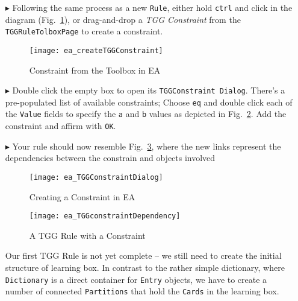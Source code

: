 \begin{enumerate}
\item[$\blacktriangleright$] Following the same process as a new \texttt{Rule}, either hold \texttt{ctrl} and click in the diagram
(Fig.~\ref{fig:common_toolbox}), or drag-and-drop a \emph{TGG Constraint} from the \texttt{TGGRuleTolboxPage} to create a constraint.

\begin{figure}[htbp]
\begin{center}
  \texttt{[image: ea\_createTGGConstraint]}
  \caption{Constraint from the Toolbox in EA}
  \label{fig:common_toolbox}
\end{center}
\end{figure}

\item[$\blacktriangleright$] Double click the empty box to open its \texttt{TGGConstraint Dialog}. There's a pre-populated list of available constraints; Choose
\texttt{eq} and double click each of the \texttt{Value} fields to specify the \texttt{a} and \texttt{b} values as depicted in
Fig.~\ref{fig:first_tgg_constraint}. Add the constraint and affirm with \texttt{OK}.

\item[$\blacktriangleright$] Your rule should now resemble Fig.~\ref{fig:tgg_rule_with_constraint}, where the new links represent the dependencies between the
  constrain and objects involved

\newpage

\begin{figure}[htbp]
\begin{center}
  \texttt{[image: ea\_TGGConstraintDialog]}
  \caption{Creating a Constraint in EA}
  \label{fig:first_tgg_constraint}
\end{center}
\end{figure}

\begin{figure}[h!]
\begin{center}
  \texttt{[image: ea\_TGGconstraintDependency]}
  \caption{A TGG Rule with a Constraint}
  \label{fig:tgg_rule_with_constraint}
  \end{center}
\end{figure}

\newpage

Our first TGG Rule is not yet complete -- we still need to create the initial structure of learning box. In contrast to the rather
simple dictionary, where \texttt{Dictionary} is a direct container for \texttt{Entry} objects, we have to create a number of connected \texttt{Partitions} that hold
the \texttt{Cards} in the learning box. 


\end{enumerate}
